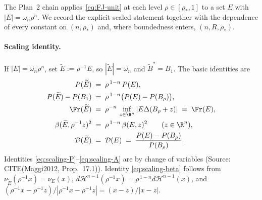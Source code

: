 The Plan~2 chain applies~\eqref{eq:FJ-unit} at each level
$\rho\in[\rho_*,1]$ to a set $E$ with $|E|=\omega_n\rho^n$. We record
the explicit scaled statement together with the dependence of every
constant on $(n,\rho_*)$ and, where boundedness enters, $(n,R,\rho_*)$.

\paragraph{Scaling identity.} If $|E|=\omega_n\rho^n$, set
$\widetilde E:=\rho^{-1}E$, so $|\widetilde E|=\omega_n$ and
$\widetilde B^*=B_1$. The basic identities are
\begin{align}
   P(\widetilde E)\;&=\;\rho^{\,1-n}\,P(E),
   \label{eq:scaling-P}\\
   P(\widetilde E)-P(B_1)\;&=\;\rho^{\,1-n}\bigl(P(E)-P(B_\rho)\bigr),
   \label{eq:scaling-DP}\\
   \Fr(\widetilde E)\;&=\;\rho^{-n}\,
       \inf_{z\in\R^n}|E\Delta(B_\rho+z)|\;=\;\Fr(E),
   \label{eq:scaling-A}\\
   \beta(\widetilde E,\rho^{-1}z)^2\;&=\;
       \rho^{\,1-n}\,\beta(E,z)^2\qquad(z\in\R^n),
   \label{eq:scaling-beta}\\
   \mathcal D(\widetilde E)\;&=\;\mathcal D(E)\;=\;
       \frac{P(E)-P(B_\rho)}{P(B_\rho)}.
   \label{eq:scaling-D}
\end{align}
Identities \eqref{eq:scaling-P}--\eqref{eq:scaling-A} are by change of
variables (Source: CITE(Maggi2012, Prop.~17.1)). Identity
\eqref{eq:scaling-beta} follows from
$\nu_{\widetilde E}(\rho^{-1}x)=\nu_E(x)$,
$d\mathcal H^{n-1}(\rho^{-1}x)=\rho^{\,1-n}d\mathcal H^{n-1}(x)$, and
$(\rho^{-1}x-\rho^{-1}z)/|\rho^{-1}x-\rho^{-1}z|=(x-z)/|x-z|$.

